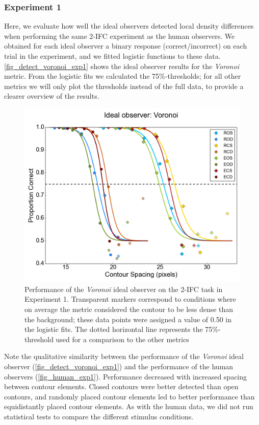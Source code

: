 \documentclass[12pt]{article}
\begin{document}
\subsubsection{Experiment 1}
Here, we evaluate how well the ideal observers detected local density differences when performing the same 2-IFC experiment as the human observers. We obtained for each ideal observer a binary response (correct/incorrect) on each trial in the experiment, and we fitted logistic functions to these data. \autoref{fig_detect_voronoi_exp1} shows the ideal observer results for the \emph{Voronoi} metric. From the logistic fits we calculated the 75\%-thresholds; for all other metrics we will only plot the thresholds instead of the full data, to provide a clearer overview of the results.

\begin{figure}[h!]
\includegraphics{Figures/FIG_detect_Voronoi_exp1.png}
\caption{Performance of the \emph{Voronoi} ideal observer on the 2-IFC task in Experiment 1. Transparent markers correspond to conditions where on average the metric considered the contour to be less dense than the background; these data points were assigned a value of 0.50 in the logistic fits. The dotted horizontal line represents the 75\%-threshold used for a comparison to the other metrics}
\label{fig_detect_voronoi_exp1}
\end{figure}

Note the qualitative similarity between the performance of the \emph{Voronoi} ideal observer (\autoref{fig_detect_voronoi_exp1}) and the performance of the human observers (\autoref{fig_human_exp1}). Performance decreased with increased spacing between contour elements. Closed contours were better detected than open contours, and randomly placed contour elements led to better performance than equidistantly placed contour elements. As with the human data, we did not run statistical tests to compare the different stimulus conditions.\\
\end{document}
